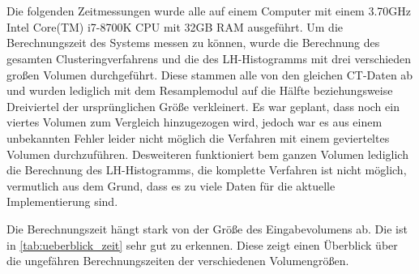\chapter{}
\label{sec:results}



Die folgenden Zeitmessungen wurde alle auf einem Computer mit einem 3.70GHz  Intel Core(TM) i7-8700K CPU mit 32GB RAM ausgeführt.
\newline
Um die Berechnungszeit des Systems messen zu können, wurde die Berechnung des gesamten Clusteringverfahrens und die des LH-Histogramms mit drei verschieden großen Volumen durchgeführt. Diese stammen alle von den gleichen CT-Daten ab und wurden lediglich  mit dem Resamplemodul auf die Hälfte beziehungsweise Dreiviertel der ursprünglichen Größe verkleinert. Es war geplant, dass noch ein viertes Volumen zum Vergleich hinzugezogen wird, jedoch war es aus einem unbekannten Fehler leider nicht möglich die Verfahren mit einem gevierteltes Volumen durchzuführen. Desweiteren funktioniert bem ganzen Volumen lediglich die Berechnung des LH-Histogramms, die komplette Verfahren ist nicht möglich, vermutlich aus dem Grund, dass es zu viele Daten für die aktuelle Implementierung sind.

Die Berechnungszeit hängt stark von der Größe des Eingabevolumens ab. Die ist in \autoref{tab:ueberblick_zeit} sehr gut zu erkennen. Diese zeigt einen Überblick über die ungefähren Berechnungszeiten der verschiedenen Volumengrößen.


\begin{table}[h]
\centering
{}
\caption{Überblick über die Berechnungszeiten der verschiedenen Volumengrößen}
\label{tab:ueberblick_zeit}
\end{table}


